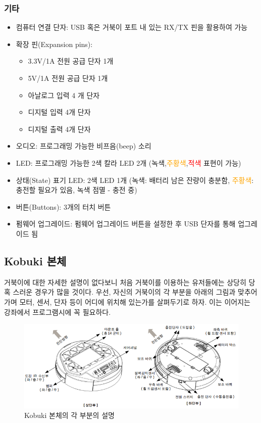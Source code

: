 \subsubsection{기타}

\begin{itemize}[leftmargin=*]
\item 컴퓨터 연결 단자: USB 혹은 거북이 포트 내 있는 RX/TX 핀을 활용하여 가능
\item 확장 핀(Expansion pins): 
  \begin{itemize}
  \item 3.3V/1A 전원 공급 단자 1개
  \item 5V/1A  전원 공급 단자 1개
  \item 아날로그 입력 4 개 단자
  \item 디지털 입력 4개 단자
  \item 디지털 출력 4개 단자
  \end{itemize}
\item 오디오: 프로그래밍 가능한 비프음(beep) 소리
\item LED: 프로그래밍 가능한 2색 칼라 LED 2개 ({\color{limegreen}녹색},\textcolor{orange}{주황색},\textcolor{red}{적색} 표현이 가능)
\item 상태(State) 표기 LED: 2색 LED 1개 ({\color{limegreen}녹색}: 배터리 남은 잔량이 충분함, \textcolor{orange}{주황색}: 충전할 필요가 있음, {\color{limegreen}녹색 점멸} - 충전 중)
\item 버튼(Buttons): 3개의 터치 버튼
\item 펌웨어 업그레이드: 펌웨어 업그레이드 버튼을 설정한 후 USB 단자를 통해 업그레이드 됨 
\end{itemize}

\subsection{Kobuki 본체}

거북이에 대한 자세한 설명이 없다보니 처음 거북이를 이용하는 유저들에는 상당히 당혹 스러운 경우가 많을 것이다. 우선, 자신의 거북이의 각 부분을 아래의 그림과 맞추어 가며 모터, 센서, 단자 등이 어디에 위치해 있는가를 살펴두기로 하자. 이는 이어지는 강좌에서 프로그램시에 꼭 필요하다. 

\begin{figure}[h]
\centering\includegraphics[width=0.9\columnwidth]{pictures/chapter10/kobuki_dimension.png}
\caption{Kobuki 본체의 각 부분의 설명}
\end{figure}

